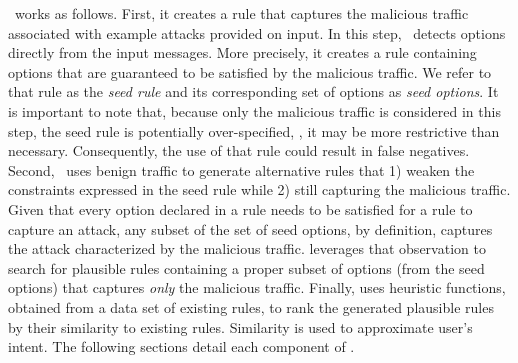 \documentclass[conference]{IEEEtran}
\begin{document}
\tname\ works as follows. First, it creates a rule that captures the
malicious traffic associated with example attacks provided on
input. In this step, \tname\ detects options directly from the input
messages. More precisely, it creates a rule containing options that
are guaranteed to be satisfied by the malicious traffic. We refer to
that rule as the \emph{seed rule} and its corresponding set of options
as \emph{seed options}. It is important to note that, because only the
malicious traffic is considered in this step, the seed rule is
potentially over-specified, \ie{}, it may be more restrictive than
necessary. Consequently, the use of that rule could result in false
negatives. Second, \tname\ uses benign traffic to generate alternative
rules that 1) weaken the constraints expressed in the seed rule while
2) still capturing the malicious traffic. Given that every option
declared in a rule needs to be satisfied for a rule to capture an
attack, any subset of the set of seed options, by definition, captures
the attack characterized by the malicious traffic. \tname{} leverages
that observation to search for plausible rules containing a proper
subset of options (from the seed options) that captures \emph{only} the
malicious traffic. Finally, \tname{} uses heuristic functions,
obtained from a data set of existing rules, to rank the generated
plausible rules by their similarity to existing rules. Similarity is
used to approximate user's intent. The following sections detail each
component of \tname.




\end{document}
